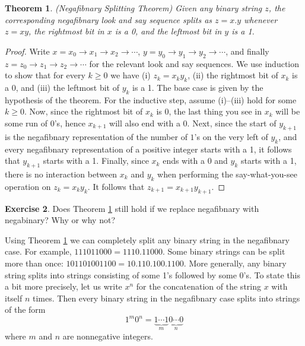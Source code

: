 \documentclass[reqno]{amsart}
\newtheorem{theorem}{Theorem}[section]
\theoremstyle{definition}
\newtheorem{exercise}[theorem]{Exercise}
\begin{document}
\begin{theorem}\label{theorem: negafibnary splitting theorem} (Negafibnary Splitting Theorem)
    Given any binary string $z$, the corresponding negafibnary look and say sequence splits as $z=x.y$ whenever $z=xy$, the rightmost bit in $x$ is a 0, and the leftmost bit in $y$ is a 1.
\end{theorem}

\begin{proof}
    Write $x=x_0\to x_1\to x_2\to\cdots$, $y=y_0\to y_1\to y_2\to\cdots$, and finally $z=z_0\to z_1\to z_2\to\cdots$ for the relevant look and say sequences. We use induction to show that for every $k\geq 0$ we have (i) $z_k=x_ky_k$, (ii) the rightmost bit of $x_k$ is a 0, and (iii) the leftmost bit of $y_k$ is a 1. The base case is given by the hypothesis of the theorem. For the inductive step, assume (i)--(iii) hold for some $k\geq 0$. Now, since the rightmost bit of $x_k$ is 0, the last thing you see in $x_k$ will be some run of 0's, hence $x_{k+1}$ will also end with a 0. Next, since the start of $y_{k+1}$ is the negafibnary representation of the number of $1$'s on the very left of $y_k$, and every negafibnary representation of a positive integer starts with a 1, it follows that $y_{k+1}$ starts with a 1. Finally, since $x_k$ ends with a 0 and $y_k$ starts with a 1, there is no interaction between $x_k$ and $y_k$ when performing the say-what-you-see operation on $z_k=x_ky_k$. It follows that $z_{k+1}=x_{k+1}y_{k+1}$.
\end{proof}

\begin{exercise}
    Does Theorem \ref{theorem: negafibnary splitting theorem} still hold if we replace negafibnary with negabinary? Why or why not? 
\end{exercise}

Using Theorem \ref{theorem: negafibnary splitting theorem} we can completely split any binary string in the negafibnary case. For example, $111011000=1110.11000$. Some binary strings can be split more than once: $101101001100=10.110.100.1100$. More generally, any binary string splits into strings consisting of some 1's followed by some 0's. To state this a bit more precisely, let us write $x^n$ for the concatenation of the string $x$ with itself $n$ times. Then every binary string in the negafibnary case splits into strings of the form 
\begin{equation}\label{binary elements}
    1^m0^n = \underbrace{1\cdots 1}_{m}\underbrace{0\cdots 0}_{n}
\end{equation}
where $m$ and $n$ are nonnegative integers. 
\end{document}
